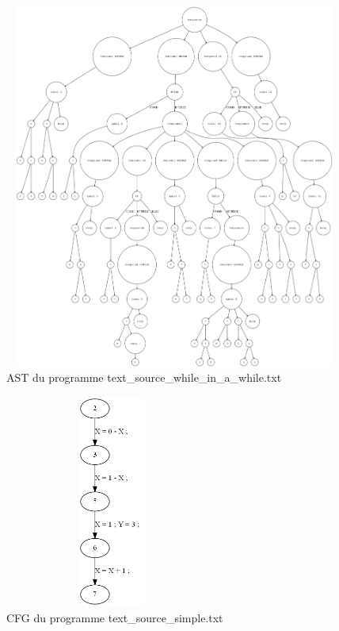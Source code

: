 \documentclass[a4paper]{article}
\begin{document}
\begin{figure}[h!]
  \centering
  \includegraphics[width=12cm,height=12cm,keepaspectratio]{input/text_source_while_in_a_while_ast.png}
  \caption{AST du programme text\_source\_while\_in\_a\_while.txt}
  \label{fig:ast4}
\end{figure}

\begin{figure}[h!]
  \centering
  \includegraphics[width=7cm,height=7cm,keepaspectratio]{input/text_source_simple_cfg.png}
  \caption{CFG du programme text\_source\_simple.txt}
  \label{fig:cfg1}
\end{figure}
\end{document}
